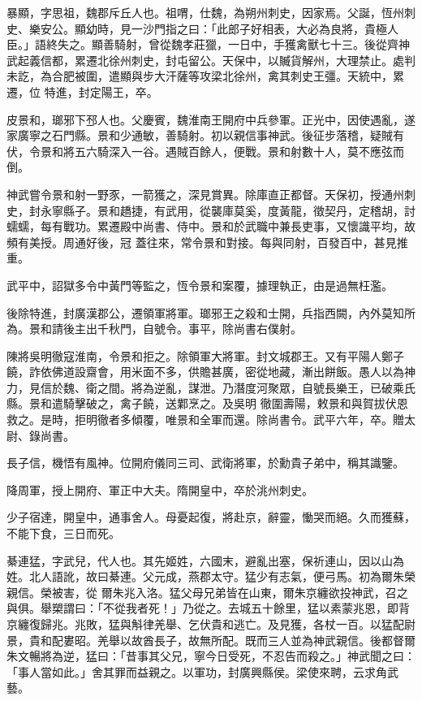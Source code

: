 \begin{pinyinscope}
 暴顯，字思祖，魏郡斥丘人也。祖喟，仕魏，為朔州刺史，因家焉。父誕，恆州刺史、樂安公。顯幼時，見一沙門指之曰：「此郎子好相表，大必為良將，貴極人臣。」語終失之。顯善騎射，曾從魏孝莊獵，一日中，手獲禽獸七十三。後從齊神武起義信都，累遷北徐州刺史，封屯留公。天保中，以贓貨解州，大理禁止。處判未訖，為合肥被圍，遣顯與步大汗薩等攻梁北徐州，禽其刺史王彊。天統中，累遷，位
 特進，封定陽王，卒。



 皮景和，瑯邪下邳人也。父慶賓，魏淮南王開府中兵參軍。正光中，因使遇亂，遂家廣寧之石門縣。景和少通敏，善騎射。初以親信事神武。後征步落稽，疑賊有伏，令景和將五六騎深入一谷。遇賊百餘人，便戰。景和射數十人，莫不應弦而倒。



 神武嘗令景和射一野豕，一箭獲之，深見賞異。除庫直正都督。天保初，授通州刺史，封永寧縣子。景和趫捷，有武用，從襲庫莫奚，度黃龍，徵契丹，定稽胡，討蠕蠕，每有戰功。累遷殿中尚書、侍中。景和於武職中兼長吏事，又懷識平均，故頻有美授。周通好後，冠
 蓋往來，常令景和對接。每與同射，百發百中，甚見推重。



 武平中，詔獄多令中黃門等監之，恆令景和案覆，據理執正，由是過無枉濫。



 後除特進，封廣漢郡公，遷領軍將軍。瑯邪王之殺和士開，兵指西闕，內外莫知所為。景和請後主出千秋門，自號令。事平，除尚書右僕射。



 陳將吳明徹寇淮南，令景和拒之。除領軍大將軍。封文城郡王。又有平陽人鄭子饒，詐依佛道設齋會，用米面不多，供贍甚廣，密從地藏，漸出餅飯。愚人以為神力，見信於魏、衛之間。將為逆亂，謀泄。乃潛度河聚眾，自號長樂王，已破乘氏縣。景和遣騎擊破之，禽子饒，送鄴烹之。及吳明
 徹圍壽陽，敕景和與賀拔伏恩救之。是時，拒明徹者多傾覆，唯景和全軍而還。除尚書令。武平六年，卒。贈太尉、錄尚書。



 長子信，機悟有風神。位開府儀同三司、武衛將軍，於勳貴子弟中，稱其識鑒。



 降周軍，授上開府、軍正中大夫。隋開皇中，卒於洮州刺史。



 少子宿達，開皇中，通事舍人。母憂起復，將赴京，辭靈，慟哭而絕。久而獲蘇，不能下食，三日而死。



 綦連猛，字武兒，代人也。其先姬姓，六國末，避亂出塞，保祈連山，因以山為姓。北人語訛，故曰綦連。父元成，燕郡太守。猛少有志氣，便弓馬。初為爾朱榮親信。榮被害，從
 爾朱兆入洛。猛父母兄弟皆在山東，爾朱京纏欲投神武，召之與俱。舉槊謂曰：「不從我者死！」乃從之。去城五十餘里，猛以素蒙兆恩，即背京纏復歸兆。兆敗，猛與斛律羌舉、乞伏貴和逃亡。及見獲，各杖一百。以猛配尉景，貴和配婁昭。羌舉以故酋長子，故無所配。既而三人並為神武親信。後都督爾朱文暢將為逆，猛曰：「昔事其父兄，寧今日受死，不忍告而殺之。」神武聞之曰：「事人當如此。」舍其罪而益親之。以軍功，封廣興縣侯。梁使來聘，云求角武藝。




\end{pinyinscope}
